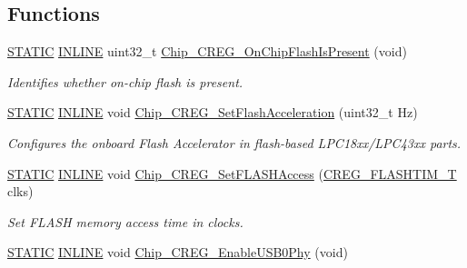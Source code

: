 \subsection*{Functions}
\begin{DoxyCompactItemize}
\item 
\hyperlink{group___l_p_c___types___public___macros_ga10b2d890d871e1489bb02b7e70d9bdfb}{S\+T\+A\+T\+IC} \hyperlink{spifi__18xx__43xx_8h_a2eb6f9e0395b47b8d5e3eeae4fe0c116}{I\+N\+L\+I\+NE} uint32\+\_\+t \hyperlink{group___c_r_e_g__18_x_x__43_x_x_gaa6600641bde2e510902377f8c62dec80}{Chip\+\_\+\+C\+R\+E\+G\+\_\+\+On\+Chip\+Flash\+Is\+Present} (void)
\begin{DoxyCompactList}\small\item\em Identifies whether on-\/chip flash is present. \end{DoxyCompactList}\item 
\hyperlink{group___l_p_c___types___public___macros_ga10b2d890d871e1489bb02b7e70d9bdfb}{S\+T\+A\+T\+IC} \hyperlink{spifi__18xx__43xx_8h_a2eb6f9e0395b47b8d5e3eeae4fe0c116}{I\+N\+L\+I\+NE} void \hyperlink{group___c_r_e_g__18_x_x__43_x_x_gabe245d16e605579542492b553eb482ee}{Chip\+\_\+\+C\+R\+E\+G\+\_\+\+Set\+Flash\+Acceleration} (uint32\+\_\+t Hz)
\begin{DoxyCompactList}\small\item\em Configures the onboard Flash Accelerator in flash-\/based L\+P\+C18xx/\+L\+P\+C43xx parts. \end{DoxyCompactList}\item 
\hyperlink{group___l_p_c___types___public___macros_ga10b2d890d871e1489bb02b7e70d9bdfb}{S\+T\+A\+T\+IC} \hyperlink{spifi__18xx__43xx_8h_a2eb6f9e0395b47b8d5e3eeae4fe0c116}{I\+N\+L\+I\+NE} void \hyperlink{group___c_r_e_g__18_x_x__43_x_x_ga8135e31d06c710b645e0752ec909308d}{Chip\+\_\+\+C\+R\+E\+G\+\_\+\+Set\+F\+L\+A\+S\+H\+Access} (\hyperlink{group___c_r_e_g__18_x_x__43_x_x_gaecbf266e1dc43b19d1cca3b7cc800786}{C\+R\+E\+G\+\_\+\+F\+L\+A\+S\+H\+T\+I\+M\+\_\+T} clks)
\begin{DoxyCompactList}\small\item\em Set F\+L\+A\+SH memory access time in clocks. \end{DoxyCompactList}\item 
\hyperlink{group___l_p_c___types___public___macros_ga10b2d890d871e1489bb02b7e70d9bdfb}{S\+T\+A\+T\+IC} \hyperlink{spifi__18xx__43xx_8h_a2eb6f9e0395b47b8d5e3eeae4fe0c116}{I\+N\+L\+I\+NE} void \hyperlink{group___c_r_e_g__18_x_x__43_x_x_gad0c399884bc0c82c8f38832eb7dee9c9}{Chip\+\_\+\+C\+R\+E\+G\+\_\+\+Enable\+U\+S\+B0\+Phy} (void)

\end{DoxyCompactItemize}
